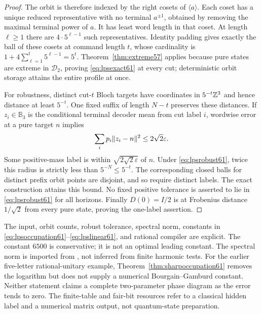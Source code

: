 \begin{proof}
The orbit is therefore indexed by the right cosets of $\langle a\rangle$.
Each coset has a unique reduced representative with no terminal
$a^{\pm1}$, obtained by removing the maximal terminal power of $a$.
It has least word length in that coset. At length $\ell\ge1$ there
are $4\cdot5^{\ell-1}$ such representatives. Identity padding gives
exactly the ball of these cosets at command length $t$, whose cardinality
is $1+4\sum_{\ell=1}^t5^{\ell-1}=5^t$.
Theorem~\ref{thm:extreme57} applies because pure states are extreme in
$\mathcal D_2$, proving \eqref{eq:lpsexact61} at every cut; deterministic
orbit storage attains the entire profile at once.

For robustness, distinct cut-$t$ Bloch targets have coordinates in
$5^{-t}\mathbb Z^3$ and hence distance at least $5^{-t}$. One fixed suffix
of length $N-t$ preserves these distances. If $z_i\in\mathbb B_3$
is the conditional terminal decoder mean from cut label $i$,
wordwise error at a pure target $n$ implies
\[
 \sum_i p_i\lVert z_i-n\rVert^2\le2\sqrt2\varepsilon.
\]
Some positive-mass label is within $\sqrt{2\sqrt2\varepsilon}$ of $n$.
Under \eqref{eq:lpsrobust61}, twice this radius is strictly less than
$5^{-N}\le5^{-t}$. The corresponding closed balls for distinct
prefix orbit points are disjoint, and so require distinct labels.
The exact construction attains this bound. No fixed positive tolerance
is asserted to lie in \eqref{eq:lpsrobust61} for all horizons.
Finally $D(0)=I/2$ is at Frobenius distance $1/\sqrt2$ from every pure
state, proving the one-label assertion.
\end{proof}

\begin{remark}\label{rem:effective61}
The input, orbit counts, robust tolerance, spectral norm, constants in
\eqref{eq:lpsoccupation61}--\eqref{eq:lpslinear61}, and rational compiler
are explicit. The constant $6500$ is conservative; it is not an optimal
leading constant. The spectral norm is imported from
\cite{LPS61,PLP61pre}, not inferred from finite harmonic tests.
For the earlier five-letter rational-unitary example,
Theorem~\ref{thm:sharpoccupation61} removes the logarithm but does not
supply a numerical Bourgain--Gamburd constant. Neither statement claims
a complete two-parameter phase diagram as the error tends to zero.
The finite-table and fair-bit resources refer to a classical hidden
label and a numerical matrix output, not quantum-state preparation.
\end{remark}
